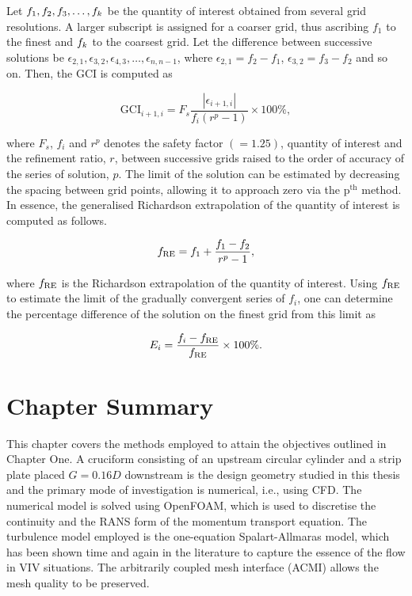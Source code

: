 \documentclass[oneside]{utmthesis}
\begin{document}
Let $f_{1},f_{2},f_{3},\dots,f_{k}$ be the quantity of interest obtained from several grid resolutions. A larger subscript is assigned for a coarser grid, thus ascribing $f_{1}$ to the finest and $f_{k}$ to the coarsest grid. Let the difference between successive solutions be $\epsilon_{2,1},\epsilon_{3,2},\epsilon_{4,3},\dots,\epsilon_{n,n-1}$, where $\epsilon_{2,1} = f_{2} - f_{1}$, $\epsilon_{3,2} = f_{3} - f_{2}$ and so on. Then, the GCI is computed as

\begin{equation}
  \text{GCI}_{i+1,i} = F_{s} \frac{\left |\epsilon_{i+1,i} \right |}{f_{i} \left ( r^{p} - 1 \right )} \times 100\%,
  \label{eq:gci}
\end{equation}

\noindent where $F_{s}$, $f_{i}$ and $r^{p}$ denotes the safety factor $\left ( = 1.25 \right )$, quantity of interest and the refinement ratio, $r$, between successive grids raised to the order of accuracy of the series of solution, $p$. The limit of the solution can be estimated by decreasing the spacing between grid points, allowing it to approach zero via the $\text{p}^{\text{th}}$ method. In essence, the generalised Richardson extrapolation of the quantity of interest is computed as follows.

\begin{equation}
  f_{\text{RE}} = f_{1} + \frac{f_{1} - f_{2}}{r^{p} - 1},
  \label{eq:richardsonExtrapolation}
\end{equation}

\noindent where $f_{\text{RE}}$ is the Richardson extrapolation of the quantity of interest. Using $f_{\text{RE}}$ to estimate the limit of the gradually convergent series of $f_{i}$, one can determine the percentage difference of the solution on the finest grid from this limit as

\begin{equation}
  E_{i} = \frac{f_{i} - f_{\text{RE}}}{f_{\text{RE}}} \times 100\%.
  \label{eq:percentageDifference}
\end{equation}

\section{Chapter Summary} \label{sec:chapSumMethod}

\vspace{\baselineskip}

This chapter covers the methods employed to attain the objectives outlined in Chapter One. A cruciform consisting of an upstream circular cylinder and a strip plate placed $G=0.16D$ downstream is the design geometry studied in this thesis and the primary mode of investigation is numerical, i.e., using CFD. The numerical model is solved using OpenFOAM, which is used to discretise the continuity and the RANS form of the momentum transport equation. The turbulence model employed is the one-equation Spalart-Allmaras model, which has been shown time and again in the literature to capture the essence of the flow in VIV situations. The arbitrarily coupled mesh interface (ACMI) allows the mesh quality to be preserved.
\end{document}
